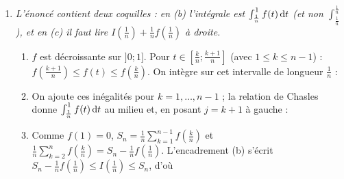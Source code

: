 \begin{description}
\begin{enumerate}
\begin{enumerate}
				Par parties avec $u(t) = \ln t$, $v'(t) = 1$ : $\int_\lambda^1 \ln t\,\dt = \left[t\ln t\right]_\lambda^1 - \int_\lambda^1 1\,\dt = -\lambda\ln\lambda - (1 - \lambda)$.
				Donc
				$I(\lambda) = \left[\frac{t^3}{3} - t\right]_\lambda^1 - 2\left(-\lambda\ln\lambda - 1 + \lambda\right) = -\frac{2}{3} - \frac{\lambda^3}{3} + \lambda + 2\lambda\ln\lambda + 2 - 2\lambda$.
				\par\noindent{}
			\item {}
				$\lim_{\lambda\to 0^+} \lambda\ln\lambda = 0$, donc \par\noindent{}
		\end{enumerate}
		\item \textit{L'énoncé contient deux coquilles : en (b) l'intégrale est $\int_{\frac{1}{n}}^{1} f(t)\,\mathrm{d}t$ (et non $\int_{\frac{1}{n}}^{\frac{1}{n}}$), et en (c) il faut lire
			$I\left(\frac{1}{n}\right) + \frac{1}{n} f\left(\frac{1}{n}\right)$ à droite.}
		\begin{enumerate}
			\item {}
				$f$ est décroissante sur $]0;1]$. Pour $t \in \left[\frac{k}{n} ; \frac{k+1}{n}\right]$ (avec $1 \leq k \leq n-1$) :
				$f\left(\frac{k+1}{n}\right) \leq f(t) \leq f\left(\frac{k}{n}\right)$. On intègre sur cet intervalle de longueur $\frac{1}{n}$ :
				\par\noindent{}
			\item {}
				On ajoute ces inégalités pour $k = 1, \ldots, n-1$ ; la relation de Chasles donne $\int_{\frac{1}{n}}^{1} f(t)\,\mathrm{d}t$ au milieu et, en posant $j = k + 1$ à gauche :
				\par\noindent{}
			\item {}
				Comme $f(1) = 0$, $S_n = \frac{1}{n}\sum_{k=1}^{n-1} f\left(\frac{k}{n}\right)$ et $\frac{1}{n}\sum_{k=2}^{n} f\left(\frac{k}{n}\right) = S_n - \frac{1}{n}f\left(\frac{1}{n}\right)$.
				L'encadrement (b) s'écrit $S_n - \frac{1}{n}f\left(\frac{1}{n}\right) \leq I\left(\frac{1}{n}\right) \leq S_n$, d'où
				\par\noindent{}

\end{enumerate}
\end{enumerate}
\end{description}
